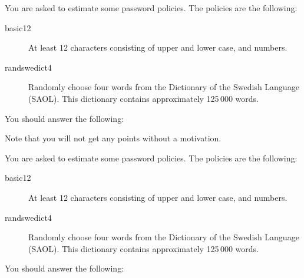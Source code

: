 \documentclass[a4paper,addpoints]{exam}
\begin{document}
\begin{questions}
  \question\label{q:passwd:infotheory:E:C:A}
  You are asked to estimate some password policies.
  The policies are the following:
  \begin{description}
    \item[basic12]
      At least 12 characters consisting of upper and lower case, and numbers.
    \item[randswedict4]
      Randomly choose four words from the Dictionary of the Swedish Language 
      (SAOL).
      This dictionary contains approximately 125\,000 words.
  \end{description}
  You should answer the following:
  Note that you will not get any points without a motivation.


  \question\label{q:passwd:infotheory:E:C:A}
  You are asked to estimate some password policies.
  The policies are the following:
  \begin{description}
    \item[basic12]
      At least 12 characters consisting of upper and lower case, and numbers.
    \item[randswedict4]
      Randomly choose four words from the Dictionary of the Swedish Language 
      (SAOL).
      This dictionary contains approximately 125\,000 words.
  \end{description}
  You should answer the following:
\end{questions}
\end{document}
